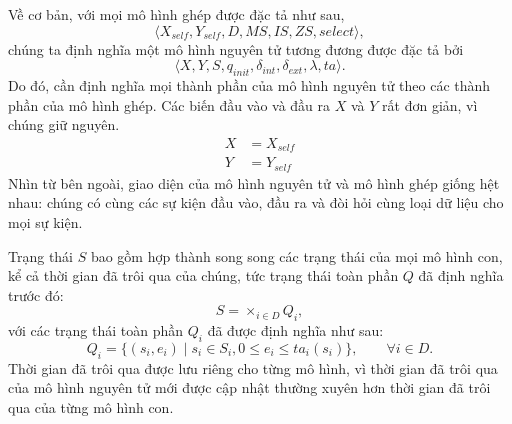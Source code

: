 Về cơ bản, với mọi mô hình ghép được đặc tả như sau,
\[
\langle X_{self},Y_{self},D,MS,IS,ZS,select\rangle,
\]
chúng ta định nghĩa một mô hình nguyên tử tương đương được đặc tả bởi
\[
\langle X,Y,S,q_{init},\delta_{int},\delta_{ext},\lambda,ta\rangle.
\]
Do đó, cần định nghĩa mọi thành phần của mô hình nguyên tử theo các thành phần của mô hình ghép. Các biến đầu vào và đầu ra $X$ và $Y$ rất đơn giản, vì chúng giữ nguyên.
\begin{align*}
X&=X_{self}\\
Y&=Y_{self}
\end{align*}
Nhìn từ bên ngoài, giao diện của mô hình nguyên tử và mô hình ghép giống hệt nhau: chúng có cùng các sự kiện đầu vào, đầu ra và đòi hỏi cùng loại dữ liệu cho mọi sự kiện.

Trạng thái $S$ bao gồm hợp thành song song các trạng thái của mọi mô hình con, kể cả thời gian đã trôi qua của chúng, tức trạng thái toàn phần $Q$ đã định nghĩa trước đó:
\[
S=\mathop{\times}_{i\in D}Q_i,
\]
với các trạng thái toàn phần $Q_i$ đã được định nghĩa như sau:
\[
Q_i=\{(s_i,e_i)\mid s_i\in S_i,0\le e_i\le ta_i(s_i)\},\qquad\forall i\in D.
\]
Thời gian đã trôi qua được lưu riêng cho từng mô hình, vì thời gian đã trôi qua của mô hình nguyên tử mới được cập nhật thường xuyên hơn thời gian đã trôi qua của từng mô hình con.

